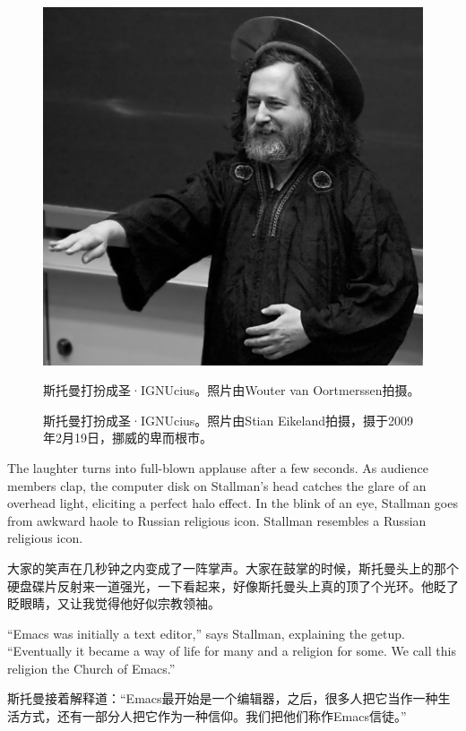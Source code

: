 \ifdefined\chs
\begin{figure}[ht] \centering
  \includegraphics{stignucius}
  \ifdefined\vone
  \caption{斯托曼打扮成圣·IGNUcius。照片由Wouter van Oortmerssen拍摄。}
  \fi
  \ifdefined\vtwo
  \caption{斯托曼打扮成圣·IGNUcius。照片由Stian Eikeland拍摄，摄于2009年2月19日，挪威的卑而根市。}
  \fi

\end{figure}
\fi

\ifdefined\eng
The laughter turns into full-blown applause after a few seconds. As audience members clap, the computer disk on Stallman's head catches the glare of an overhead light, eliciting a perfect halo effect. In the blink of an eye, 
\ifdefined\vone
Stallman goes from awkward haole to Russian religious icon.
\fi
\ifdefined\vtwo
Stallman resembles a Russian religious icon.
\fi
\fi

\ifdefined\chs
大家的笑声在几秒钟之内变成了一阵掌声。大家在鼓掌的时候，斯托曼头上的那个硬盘碟片反射来一道强光，一下看起来，好像斯托曼头上真的顶了个光环。他眨了眨眼睛，又让我觉得他好似宗教领袖。
\fi

\ifdefined\eng
``Emacs was initially a text editor,'' says Stallman, explaining the getup. ``Eventually it became a way of life for many and a religion for some. We call this religion the Church of Emacs.''
\fi

\ifdefined\chs
斯托曼接着解释道：``Emacs最开始是一个编辑器，之后，很多人把它当作一种生活方式，还有一部分人把它作为一种信仰。我们把他们称作Emacs信徒。''
\fi

